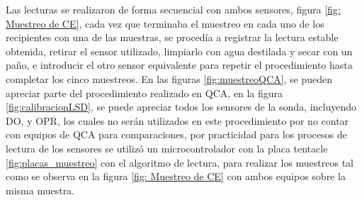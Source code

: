 Las lecturas se realizaron de forma secuencial con ambos sensores, figura \ref{fig: Muestreo de CE}, cada vez que terminaba el muestreo en cada uno de los recipientes con una de las muestras, se proced\'ia a registrar la lectura estable obtenida, retirar el sensor utilizado, limpiarlo con agua destilada y secar con un pa\~no, e introducir el otro sensor equivalente para repetir el procedimiento hasta completar los cinco muestreos.
En las figuras \ref{fig:muestreoQCA}, se pueden apreciar parte del procedimiento realizado en QCA, en la figura \ref{fig:calibracionLSD}, se puede apreciar todos los sensores de la sonda, incluyendo DO, y OPR, los cuales no serán utilizados en este procedimiento por no contar con equipos de QCA para comparaciones, por practicidad para los procesos de lectura de los sensores se utilizó un microcontrolador con la placa tentacle \ref{fig:placas_muestreo} con el algoritmo de lectura, para realizar los muestreos tal como se observa en la figura \ref{fig: Muestreo de CE} con ambos equipos sobre la misma muestra.
